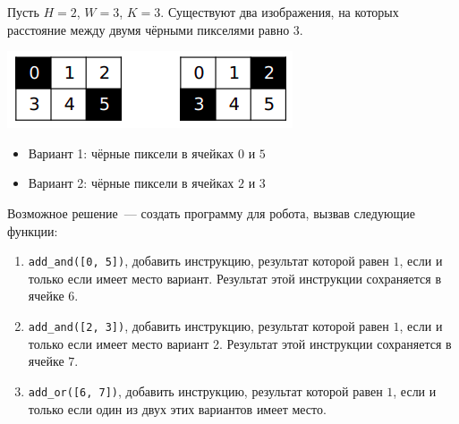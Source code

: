 Пусть $H=2$, $W=3$, $K=3$. Существуют два изображения, на которых расстояние
между двумя чёрными пикселями равно $3$.

\includegraphics{1.png}

\begin{itemize}
\item Вариант 1: чёрные пиксели в ячейках $0$ и $5$
\item Вариант 2: чёрные пиксели в ячейках $2$ и $3$
\end{itemize}

Возможное решение~--- создать программу для робота, вызвав следующие
функции:

\begin{enumerate}
\item \texttt{add\_and([0, 5])}, добавить инструкцию, результат которой равен $1$, если и
только если имеет место вариант. Результат этой инструкции сохраняется в ячейке $6$.
\item \texttt{add\_and([2, 3])}, добавить инструкцию, результат которой равен $1$, если и
только если имеет место вариант 2. Результат этой инструкции сохраняется в ячейке $7$.
\item \texttt{add\_or([6, 7])},  добавить инструкцию, результат которой равен $1$, если и
только если один из двух этих вариантов имеет место.
\end{enumerate}
